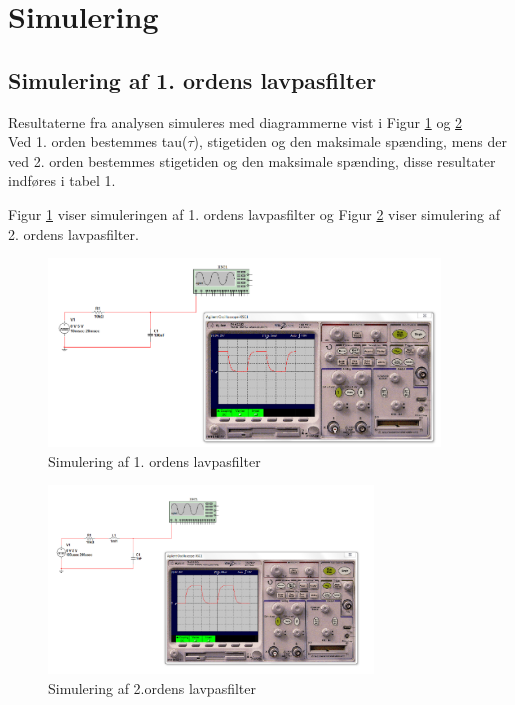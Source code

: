 \section{Simulering}

\subsection{Simulering af 1. ordens lavpasfilter}
Resultaterne fra analysen simuleres med diagrammerne vist i Figur \ref{1.orden} og \ref{2orden}
\\
Ved 1. orden bestemmes tau($\tau$), stigetiden og den maksimale spænding, mens der ved 2. orden bestemmes stigetiden og den maksimale spænding, disse resultater indføres i tabel 1.

Figur \ref{1.orden} viser simuleringen af 1. ordens lavpasfilter og Figur \ref{2orden} viser simulering af 2. ordens lavpasfilter.

\begin{figure}[h!]
 \begin{center}
  \includegraphics[height=5cm]{P_Fig/figur1.png}
  \caption{Simulering af 1. ordens lavpasfilter}
  \label{1.orden}
 \end{center}
\end{figure}

\begin{figure}[h]
 \begin{center}
  \includegraphics[height=5cm]{P_Fig/figur12_2orden}
  \caption{Simulering af 2.ordens lavpasfilter}
  \label{2orden}
 \end{center}
\end{figure}

